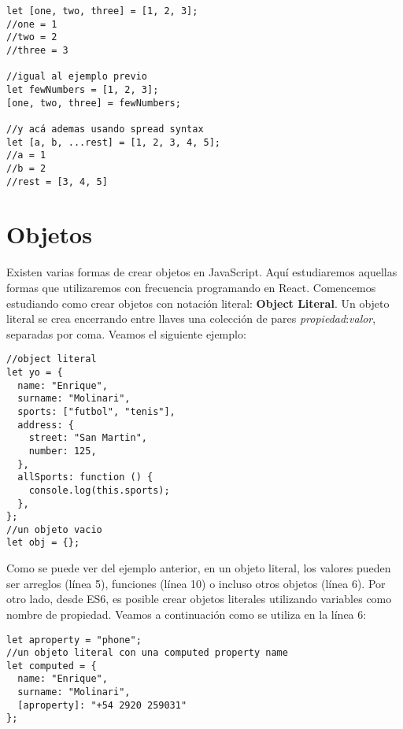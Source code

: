 \documentclass[a4paper, oneside, titlepage, 12pt]{paper}
\begin{document}
\begin{verbatim}
let [one, two, three] = [1, 2, 3];
//one = 1
//two = 2
//three = 3

//igual al ejemplo previo
let fewNumbers = [1, 2, 3];
[one, two, three] = fewNumbers;

//y acá ademas usando spread syntax
let [a, b, ...rest] = [1, 2, 3, 4, 5];
//a = 1
//b = 2
//rest = [3, 4, 5]
\end{verbatim}


\section{Objetos}\label{jsobjects}

Existen varias formas de crear objetos en JavaScript. Aquí estudiaremos aquellas formas que utilizaremos con frecuencia programando en React. Comencemos estudiando como crear objetos con notación literal: \textbf{Object Literal}. Un objeto literal se crea encerrando entre llaves una colección de pares \textit{propiedad}:\textit{valor}, separadas por coma. Veamos el siguiente ejemplo: 

\begin{verbatim}
//object literal
let yo = {
  name: "Enrique",
  surname: "Molinari",
  sports: ["futbol", "tenis"],
  address: {
    street: "San Martin",
    number: 125,
  },
  allSports: function () {
    console.log(this.sports);
  },
};
//un objeto vacio
let obj = {};
\end{verbatim}

Como se puede ver del ejemplo anterior, en un objeto literal, los valores pueden ser arreglos (línea 5), funciones (línea 10) o incluso otros objetos (línea 6). Por otro lado, desde ES6, es posible crear objetos literales utilizando variables como nombre de propiedad. Veamos a continuación como se utiliza en la línea 6: 

\begin{verbatim}
let aproperty = "phone";               
//un objeto literal con una computed property name 
let computed = {
  name: "Enrique",
  surname: "Molinari",
  [aproperty]: "+54 2920 259031"
};

\end{verbatim}
\end{document}
